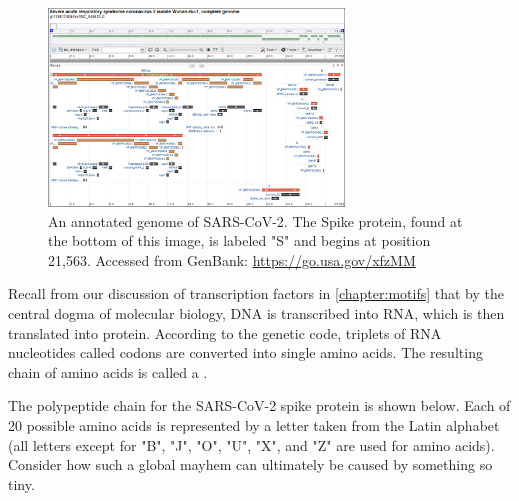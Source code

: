 \begin{figure}[h]
	\centering
	\mySfFamily
	\includegraphics[width = 0.7\textwidth]{../images/SARSCoV2Annotation.png}
	\caption{An annotated genome of SARS-CoV-2. The Spike protein, found at the bottom of this image, is labeled "S" and begins at position 21,563. Accessed from GenBank: \url{https://go.usa.gov/xfzMM}}
	\label{fig:SARSCoV2Annotation}
\end{figure}

Recall from our discussion of transcription factors in \autoref{chapter:motifs} that by the central dogma of molecular biology, DNA is transcribed into RNA, which is then translated into protein. According to the genetic code, triplets of RNA nucleotides called codons are converted into single amino acids. The resulting chain of amino acids is called a .

The polypeptide chain for the SARS-CoV-2 spike protein is shown below. Each of 20 possible amino acids is represented by a letter taken from the Latin alphabet (all letters except for "B", "J", "O", "U", "X", and "Z" are used for amino acids). Consider how such a global mayhem can ultimately be caused by something so tiny.

